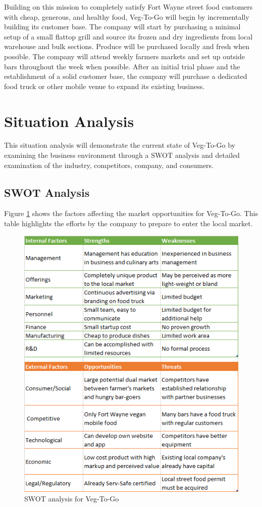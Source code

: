 \documentclass[12pt, letterpaper]{article}
\newcommand{\companyname}{Veg-To-Go}
\begin{document}
Building on this mission to completely satisfy Fort Wayne street food customers with cheap, generous, and healthy food, Veg-To-Go will begin by incrementally building its customer base.  The company will start by purchasing a minimal setup of a small flattop grill and source its frozen and dry ingredients from local warehouse and bulk sections. Produce will be purchased locally and fresh when possible.  The company will attend weekly farmers markets and set up outside bars throughout the week when possible.  After an initial trial phase and the establishment of a solid customer base, the company will purchase a dedicated food truck or other mobile venue to expand its existing business.

\section{Situation Analysis}
This situation analysis will demonstrate the current state of \companyname{} by examining the business environment through a SWOT analysis and detailed examination of the industry, competitors, company, and consumers.

\subsection{SWOT Analysis}
Figure \ref{SWOT} shows the factors affecting the market opportunities for \companyname{}.  This table highlights the efforts by the company to prepare to enter the local market.

\begin{figure}[H]
	\label{SWOT}
	\caption{SWOT analysis for \companyname{}}
	\centering
	\includegraphics{SWOT}
\end{figure}
\end{document}
